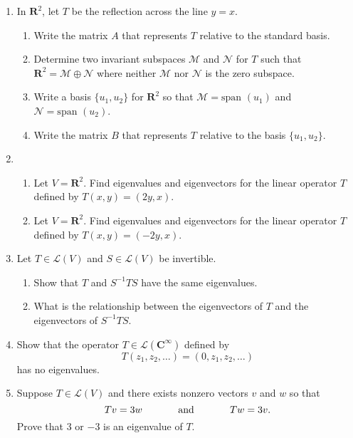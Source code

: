 \documentclass[12pt]{article}
\begin{document}
\begin{enumerate}
\item In $\mathbf{R}^2$, let $T$ be the reflection across the line $y=x$.
    \begin{enumerate}
    \item Write the matrix $A$ that represents $T$ relative to the standard basis.
    \item Determine two invariant subspaces $\mathcal{M}$ and $\mathcal{N}$ for $T$ such that $\mathbf{R}^2 = \mathcal{M} \oplus \mathcal{N}$ where neither $\mathcal{M}$ nor $\mathcal{N}$ is the zero subspace.
    \item Write a basis $\{ u_1, u_2 \}$ for $\mathbf{R}^2$ so that $\mathcal{M} = \text{span } (u_1)$ and  $\mathcal{N} = \text{span } (u_2)$.
    \item Write the matrix $B$ that represents $T$ relative to the basis $\{ u_1, u_2 \}$.
    \end{enumerate}

\item \begin{enumerate}
        \item Let $V = \mathbf{R}^2$. Find eigenvalues and eigenvectors for the linear operator $T$ defined by $T(x,y) = (2y , x)$.
        \item Let $V = \mathbf{R}^2$. Find eigenvalues and eigenvectors for the linear operator $T$ defined by $T(x,y) = (-2y , x)$.
        \end{enumerate}

\item Let $T \in \mathcal{L}(V)$ and $S \in \mathcal{L}(V)$ be invertible.
    \begin{enumerate}
    \item Show that $T$ and $S^{-1}TS$ have the same eigenvalues.
    \item What is the relationship between the eigenvectors of $T$ and the eigenvectors of $S^{-1}TS$.
    \end{enumerate}

\item Show that the operator $T \in \mathcal{L}(\mathbf{C}^\infty)$ defined by
    \[
    T(z_1,z_2, \ldots) = (0,z_1,z_2, \ldots)
    \]
    has no eigenvalues.

\item Suppose $T \in \mathcal{L}(V)$ and there exists nonzero vectors $v$ and $w$ so that
    \[
        Tv = 3w \hspace{.5in} \text{and} \hspace{.5in} Tw=3v.
    \]
    Prove that 3 or $-3$ is an eigenvalue of $T$.

\end{enumerate}
\end{document}
